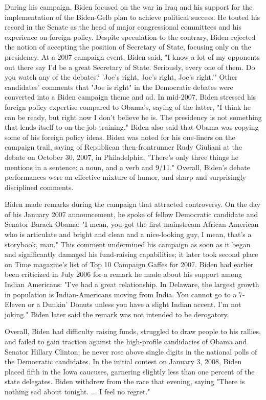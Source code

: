 During his campaign, Biden focused on the war in Iraq and his support
for the implementation of the Biden-Gelb plan to achieve political
success. He touted his record in the Senate as the head of major
congressional committees and his experience on foreign policy. Despite
speculation to the contrary, Biden rejected the notion of accepting the
position of Secretary of State, focusing only on the presidency. At a
2007 campaign event, Biden said, "I know a lot of my opponents out there
say I'd be a great Secretary of State. Seriously, every one of them. Do
you watch any of the debates? 'Joe's right, Joe's right, Joe's right.'"
Other candidates' comments that "Joe is right" in the Democratic debates
were converted into a Biden campaign theme and ad. In mid-2007, Biden
stressed his foreign policy expertise compared to Obama's, saying of the
latter, "I think he can be ready, but right now I don't believe he is.
The presidency is not something that lends itself to on-the-job
training." Biden also said that Obama was copying some of his foreign
policy ideas. Biden was noted for his one-liners on the campaign trail,
saying of Republican then-frontrunner Rudy Giuliani at the debate on
October 30, 2007, in Philadelphia, "There's only three things he
mentions in a sentence: a noun, and a verb and 9/11." Overall, Biden's
debate performances were an effective mixture of humor, and sharp and
surprisingly disciplined comments.

Biden made remarks during the campaign that attracted controversy. On
the day of his January 2007 announcement, he spoke of fellow Democratic
candidate and Senator Barack Obama: "I mean, you got the first
mainstream African-American who is articulate and bright and clean and a
nice-looking guy, I mean, that's a storybook, man." This comment
undermined his campaign as soon as it began and significantly damaged
his fund-raising capabilities; it later took second place on Time
magazine's list of Top 10 Campaign Gaffes for 2007. Biden had earlier
been criticized in July 2006 for a remark he made about his support
among Indian Americans: "I've had a great relationship. In Delaware, the
largest growth in population is Indian-Americans moving from India. You
cannot go to a 7-Eleven or a Dunkin' Donuts unless you have a slight
Indian accent. I'm not joking." Biden later said the remark was not
intended to be derogatory.

Overall, Biden had difficulty raising funds, struggled to draw people to
his rallies, and failed to gain traction against the high-profile
candidacies of Obama and Senator Hillary Clinton; he never rose above
single digits in the national polls of the Democratic candidates. In the
initial contest on January 3, 2008, Biden placed fifth in the Iowa
caucuses, garnering slightly less than one percent of the state
delegates. Biden withdrew from the race that evening, saying "There is
nothing sad about tonight. ... I feel no regret."

